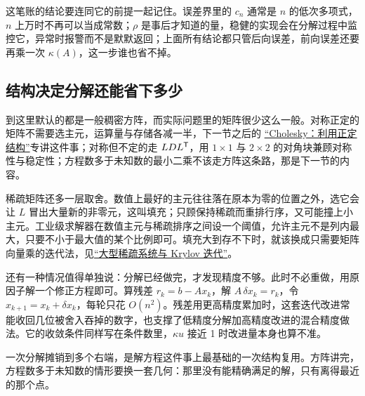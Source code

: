 这笔账的结论要连同它的前提一起记住。误差界里的 \(c_n\) 通常是 \(n\) 的低次多项式，\(n\) 上万时不再可以当成常数；\(\rho\) 是事后才知道的量，稳健的实现会在分解过程中监控它，异常时报警而不是默默返回；上面所有结论都只管后向误差，前向误差还要再乘一次 \(\kappa(A)\)，这一步谁也省不掉。

\subsection{结构决定分解还能省下多少}

到这里默认的都是一般稠密方阵，而实际问题里的矩阵很少这么一般。对称正定的矩阵不需要选主元，运算量与存储各减一半，下一节之后的 \hyperref[sec:08-Numerical-Analysis/05-Numerical-Linear-Algebra/03]{``Cholesky：利用正定结构''}专讲这件事；对称但不定的走 \(LDL^{\mathsf{T}}\)，用 \(1\times1\) 与 \(2\times2\) 的对角块兼顾对称性与稳定性；方程数多于未知数的最小二乘不该走方阵这条路，那是下一节的内容。

稀疏矩阵还多一层取舍。数值上最好的主元往往落在原本为零的位置之外，选它会让 \(L\) 冒出大量新的非零元，这叫填充；只顾保持稀疏而重排行序，又可能撞上小主元。工业级求解器在数值主元与稀疏排序之间设一个阈值，允许主元不是列内最大，只要不小于最大值的某个比例即可。填充大到存不下时，就该换成只需要矩阵向量乘的迭代法，见\hyperref[sec:08-Numerical-Analysis/05-Numerical-Linear-Algebra/04]{``大型稀疏系统与 Krylov 迭代''}。

还有一种情况值得单独说：分解已经做完，才发现精度不够。此时不必重做，用原因子解一个修正方程即可。算残差 \(r_k=b-Ax_k\)，解 \(A\,\delta x_k=r_k\)，令 \(x_{k+1}=x_k+\delta x_k\)，每轮只花 \(O(n^2)\)。残差用更高精度累加时，这套迭代改进常能收回几位被舍入吞掉的数字，也支撑了低精度分解加高精度改进的混合精度做法。它的收敛条件同样写在条件数里，\(\kappa u\) 接近 1 时改进量本身也算不准。

一次分解摊销到多个右端，是解方程这件事上最基础的一次结构复用。方阵讲完，方程数多于未知数的情形要换一套几何：那里没有能精确满足的解，只有离得最近的那个点。

